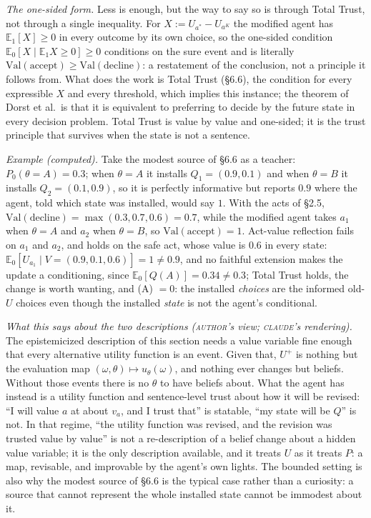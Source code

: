 \documentclass[11pt,a4paper]{article}
\newcommand{\Val}{\mathrm{Val}}
\newcommand{\accept}{\text{accept}}
\newcommand{\decline}{\text{decline}}
\newcommand{\AUTHOR}{\textnormal{\scshape author}}
\newcommand{\CLAUDE}{\textnormal{\scshape claude}}
\begin{document}
\emph{The one-sided form.} Less is enough, but the way to say so is through Total Trust, not through a single inequality. For $X := U_{a^*} - U_{a^K}$ the modified agent has $\mathbb E_1[X] \ge 0$ in every outcome by its own choice, so the one-sided condition $\mathbb E_0[X \mid \mathbb E_1 X \ge 0] \ge 0$ conditions on the sure event and is literally $\Val(\accept) \ge \Val(\decline)$: a restatement of the conclusion, not a principle it follows from. What does the work is Total Trust (\S6.6), the condition for every expressible $X$ and every threshold, which implies this instance; the theorem of Dorst et al.\ is that it is equivalent to preferring to decide by the future state in every decision problem. Total Trust is value by value and one-sided; it is the trust principle that survives when the state is not a sentence.

\emph{Example (computed).} Take the modest source of \S6.6 as a teacher: $P_0(\theta = A) = 0.3$; when $\theta = A$ it installs $Q_1 = (0.9, 0.1)$ and when $\theta = B$ it installs $Q_2 = (0.1, 0.9)$, so it is perfectly informative but reports $0.9$ where the agent, told which state was installed, would say $1$. With the acts of \S2.5, $\mathrm{Val}(\text{decline}) = \max(0.3, 0.7, 0.6) = 0.7$, while the modified agent takes $a_1$ when $\theta = A$ and $a_2$ when $\theta = B$, so $\mathrm{Val}(\text{accept}) = 1$. Act-value reflection fails on $a_1$ and $a_2$, and holds on the safe act, whose value is $0.6$ in every state: $\mathbb E_0[ U_{a_1} \mid V = (0.9, 0.1, 0.6)] = 1 \ne 0.9$, and no faithful extension makes the update a conditioning, since $\mathbb E_0[ Q(A)] = 0.34 \ne 0.3$; Total Trust holds, the change is worth wanting, and (A) $= 0$: the installed \emph{choices} are the informed old-$U$ choices even though the installed \emph{state} is not the agent's conditional.

\emph{What this says about the two descriptions (\AUTHOR's view; \CLAUDE's rendering).} The epistemicized description of this section needs a value variable fine enough that every alternative utility function is an event. Given that, $U^+$ is nothing but the evaluation map $(\omega, \theta) \mapsto u_\theta(\omega)$, and nothing ever changes but beliefs. Without those events there is no $\theta$ to have beliefs about. What the agent has instead is a utility function and sentence-level trust about how it will be revised: ``I will value $a$ at about $v_a$, and I trust that'' is statable, ``my state will be $Q$'' is not. In that regime, ``the utility function was revised, and the revision was trusted value by value'' is not a re-description of a belief change about a hidden value variable; it is the only description available, and it treats $U$ as it treats $P$: a map, revisable, and improvable by the agent's own lights. The bounded setting is also why the modest source of \S6.6 is the typical case rather than a curiosity: a source that cannot represent the whole installed state cannot be immodest about it.
\end{document}
